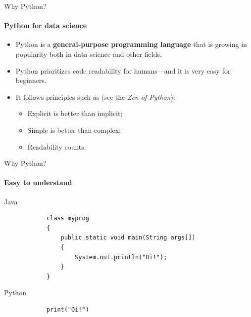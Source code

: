 \documentclass[notes,11pt, aspectratio=169, xcolor=table]{beamer}
\begin{document}
    \begin{frame}{Why Python?}
    \framesubtitle{Python for data science}
        
        \begin{itemize}
          \item Python is a \textbf{general‑purpose programming language} that is growing in popularity both in data science and other fields.
          \item Python prioritizes code readability for humans—and it is very easy for beginners.
          \item It follows principles such as (see the \textit{Zen of Python}):
             \begin{itemize}
                \item Explicit is better than implicit;
                \item Simple is better than complex;
                \item Readability counts.
            \end{itemize}
        \end{itemize}

    \end{frame}
    
    \begin{frame}[fragile=singleslide]{Why Python?}
    \framesubtitle{Easy to understand}

    \begin{block}{Java}
        \begin{verbatim}
            class myprog
            {
                public static void main(String args[])
                {
                    System.out.println("Oi!");
                }
            }
                    \end{verbatim}
    \end{block}
    
    \begin{alertblock}{Python}
        \begin{verbatim}
            print("Oi!")
        \end{verbatim}
    \end{alertblock}

    \end{frame}
\end{document}
